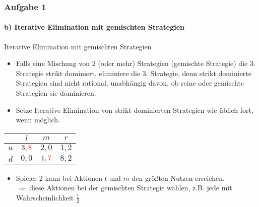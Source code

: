 \documentclass{beamer}
\begin{document}
\begin{frame}
	\frametitle{Aufgabe 1}
	\framesubtitle{b) Iterative Elimination mit gemischten Strategien}

	\centering
	\begin{block}{Iterative Elimination mit gemischten Strategien}
		\begin{itemize}
			\item Falls eine Mischung von 2 (oder mehr) Strategien (gemischte Strategie) die 3. Strategie strikt dominiert, eliminiere die 3. Strategie, denn strikt dominierte Strategien sind nicht rational, unabhängig davon, ob reine oder gemischte Strategien sie dominieren.
			\item Setze Iterative Elimination von strikt dominierten Strategien wie üblich fort, wenn möglich.
		\end{itemize}
	\end{block}

	\begin{tabular}{r|c|c|c|}
		& $l$ & $m$ & $r$ \\
		\hline
		$u$ & $3, \textcolor{red}{8}$ & $2, 0$ & $1, 2$ \\
		$d$ & $0, 0$ & $1, \textcolor{red}{7}$ & $8, 2$ \\
		\hline
	\end{tabular}

	\begin{itemize}
		\item Spieler 2 kann bei Aktionen $l$ und $m$ den größten Nutzen erreichen.\\
		$\Rightarrow$ diese Aktionen bei der gemischten Strategie wählen, z.B. jede mit Wahrscheinlichkeit $\frac{1}{2}$
	\end{itemize}
\end{frame}
\end{document}
